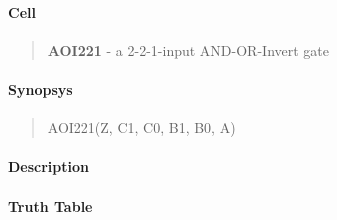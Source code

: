 \label{AOI221}
\paragraph{Cell}
\begin{quote}
    \textbf{AOI221} - a 2-2-1-input AND-OR-Invert gate
\end{quote}

\paragraph{Synopsys}
\begin{quote}
    AOI221(Z, C1, C0, B1, B0, A)
\end{quote}

\paragraph{Description}



\paragraph{Truth Table}


